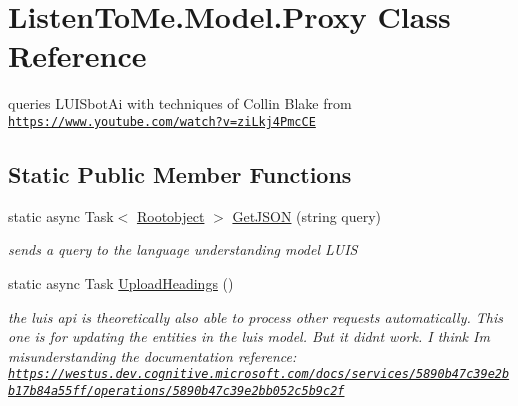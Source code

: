 \hypertarget{class_listen_to_me_1_1_model_1_1_proxy}{}\section{Listen\+To\+Me.\+Model.\+Proxy Class Reference}
\label{class_listen_to_me_1_1_model_1_1_proxy}


queries L\+U\+I\+Sbot\+Ai with techniques of Collin Blake from \href{https://www.youtube.com/watch?v=ziLkj4PmcCE}{\tt https\+://www.\+youtube.\+com/watch?v=zi\+Lkj4\+Pmc\+CE}  


\subsection*{Static Public Member Functions}
\begin{DoxyCompactItemize}
\item 
static async Task$<$ \mbox{\hyperlink{class_listen_to_me_1_1_model_1_1_rootobject}{Rootobject}} $>$ \mbox{\hyperlink{class_listen_to_me_1_1_model_1_1_proxy_a5207b409f3a97f2450e9dce1108a6da1}{Get\+J\+S\+ON}} (string query)
\begin{DoxyCompactList}\small\item\em sends a query to the language understanding model L\+U\+IS \end{DoxyCompactList}\item 
static async Task \mbox{\hyperlink{class_listen_to_me_1_1_model_1_1_proxy_a6e03af261e464fb9b5a25e99b5209c32}{Upload\+Headings}} ()
\begin{DoxyCompactList}\small\item\em the luis api is theoretically also able to process other requests automatically. This one is for updating the entities in the luis model. But it didn\textquotesingle{}t work. I think I\textquotesingle{}m misunderstanding the documentation reference\+: \href{https://westus.dev.cognitive.microsoft.com/docs/services/5890b47c39e2bb17b84a55ff/operations/5890b47c39e2bb052c5b9c2f}{\tt https\+://westus.\+dev.\+cognitive.\+microsoft.\+com/docs/services/5890b47c39e2bb17b84a55ff/operations/5890b47c39e2bb052c5b9c2f} \end{DoxyCompactList}\end{DoxyCompactItemize}
